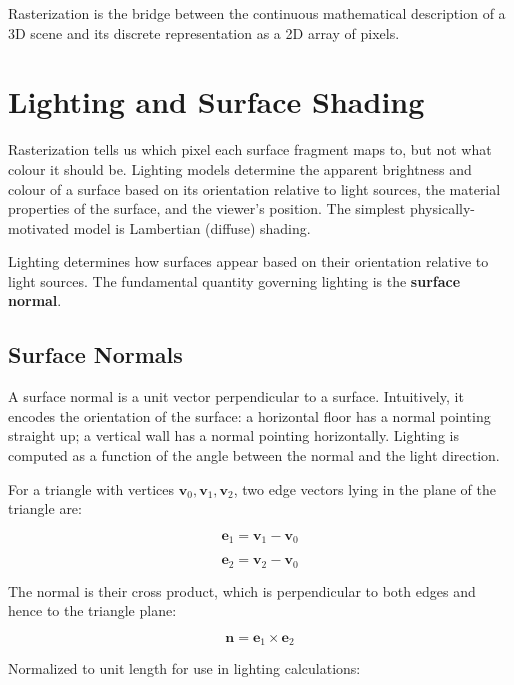 \documentclass[11pt]{article}
\begin{document}
Rasterization is the bridge between the continuous mathematical description of a 3D scene and its discrete representation as a 2D array of pixels.

\section{Lighting and Surface Shading}

Rasterization tells us which pixel each surface fragment maps to, but not what colour it should be. Lighting models determine the apparent brightness and colour of a surface based on its orientation relative to light sources, the material properties of the surface, and the viewer's position. The simplest physically-motivated model is Lambertian (diffuse) shading.

Lighting determines how surfaces appear based on their orientation relative to light sources. The fundamental quantity governing lighting is the \textbf{surface normal}.


\subsection{Surface Normals}

A surface normal is a unit vector perpendicular to a surface. Intuitively, it encodes the orientation of the surface: a horizontal floor has a normal pointing straight up; a vertical wall has a normal pointing horizontally. Lighting is computed as a function of the angle between the normal and the light direction.

For a triangle with vertices $\mathbf{v}_0, \mathbf{v}_1, \mathbf{v}_2$, two edge vectors lying in the plane of the triangle are:

\begin{equation}
    \mathbf{e}_1 = \mathbf{v}_1 - \mathbf{v}_0
\end{equation}

\begin{equation}
    \mathbf{e}_2 = \mathbf{v}_2 - \mathbf{v}_0
\end{equation}

The normal is their cross product, which is perpendicular to both edges and hence to the triangle plane:

\begin{equation}
    \mathbf{n} = \mathbf{e}_1 \times \mathbf{e}_2
\end{equation}

Normalized to unit length for use in lighting calculations:
\end{document}
